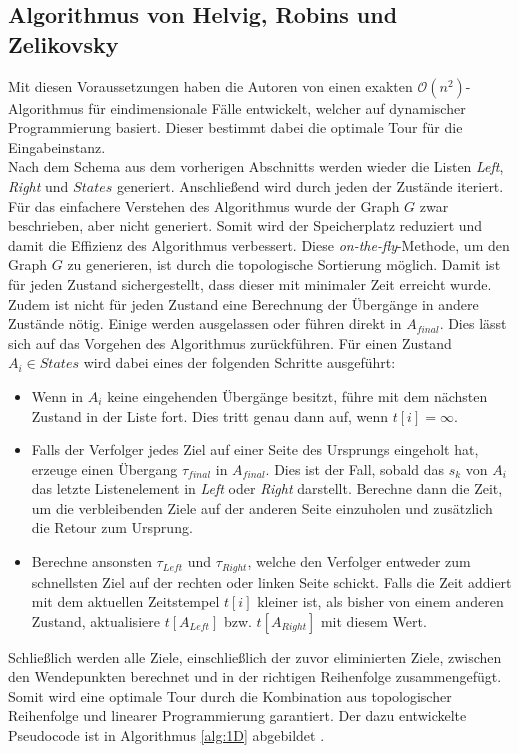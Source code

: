 \documentclass[german,version-2019-11]{uzl-thesis}
\begin{document}
\subsection{Algorithmus von Helvig, Robins und Zelikovsky}

Mit diesen Voraussetzungen haben die Autoren von \cite{helvig} einen exakten $\mathcal{O}(n^2)$-Algorithmus für eindimensionale Fälle entwickelt, welcher auf dynamischer Programmierung basiert. Dieser bestimmt dabei die optimale Tour für die Eingabeinstanz. \\
Nach dem Schema aus dem vorherigen Abschnitts werden wieder die Listen \emph{Left}, \emph{Right} und $States$ generiert. Anschließend wird durch jeden der Zustände iteriert. Für das einfachere Verstehen des Algorithmus wurde der Graph $G$ zwar beschrieben, aber nicht generiert. Somit wird der Speicherplatz reduziert und damit die Effizienz des Algorithmus verbessert. Diese \emph{on-the-fly}-Methode, um den Graph $G$ zu generieren, ist durch die topologische Sortierung möglich. Damit ist für jeden Zustand sichergestellt, dass dieser mit minimaler Zeit erreicht wurde. Zudem ist nicht für jeden Zustand eine Berechnung der Übergänge in andere Zustände nötig. Einige werden ausgelassen oder führen direkt in $A_{final}$. Dies lässt sich auf das Vorgehen des Algorithmus zurückführen. Für einen Zustand $A_i\in States$ wird dabei eines der folgenden Schritte ausgeführt:
\begin{itemize}
\item Wenn in $A_i$ keine eingehenden Übergänge besitzt, führe mit dem nächsten Zustand in der Liste fort. Dies tritt genau dann auf, wenn $t[i] = \infty$.
\item Falls der Verfolger jedes Ziel auf einer Seite des Ursprungs eingeholt hat, erzeuge einen Übergang $\tau_{final}$ in $A_{final}$. Dies ist der Fall, sobald das $s_k$ von $A_i$ das letzte Listenelement in \emph{Left} oder \emph{Right} darstellt. Berechne dann die Zeit, um die verbleibenden Ziele auf der anderen Seite einzuholen und zusätzlich die Retour zum Ursprung. 
\item Berechne ansonsten $\tau_{Left}$ und $\tau_{Right}$, welche den Verfolger entweder zum schnellsten Ziel auf der rechten oder linken Seite schickt. Falls die Zeit addiert mit dem aktuellen Zeitstempel $t[i]$ kleiner ist, als bisher von einem anderen Zustand, aktualisiere $t[A_{Left}]$ bzw. $t[A_{Right}]$ mit diesem Wert.
\end{itemize}
Schließlich werden alle Ziele, einschließlich der zuvor eliminierten Ziele, zwischen den Wendepunkten berechnet und in der richtigen Reihenfolge zusammengefügt. Somit wird eine optimale Tour durch die Kombination aus topologischer Reihenfolge und linearer Programmierung garantiert. Der dazu entwickelte Pseudocode ist in Algorithmus \ref{alg:1D} abgebildet \cite{helvig}. 
\end{document}
